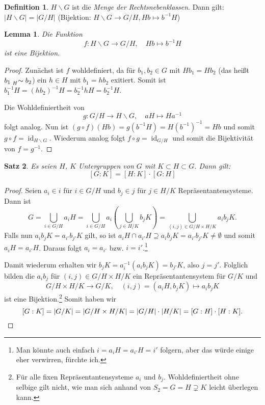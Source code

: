 \documentclass[12pt]{scrartcl} %
\DeclareMathOperator{\id}{id}
\newtheorem{thm}{Satz}[section]
\newtheorem{lemma}[thm]{Lemma}
\theoremstyle{definition}
\newtheorem*{defn}{Definition}
\theoremstyle{remark}
\begin{document}
\begin{defn}
	$H \backslash G$ ist die \emph{Menge der Rechtsnebenklassen}. Dann gilt: $\vert H \backslash G \vert = \vert G/H \vert$
	(Bijektion: $H \backslash G \rightarrow G/H, Hb \mapsto b^{-1}H$)
\end{defn}

\begin{lemma} 
	Die Funktion $$f: H\backslash G \to G/H, \quad Hb \mapsto b^{-1}H$$ ist eine Bijektion.
\end{lemma}

\begin{proof}
	Zunächst ist \(f\) wohldefiniert, da für $b_{1},b_{2} \in G$ mit $Hb_{1}=Hb_{2}$ (das heißt \(b_1 \mathrel{\prescript{}{H}{\sim}} b_2\)) ein $h \in H$ mit $b_1 = hb_2$ exitiert.
	Somit ist $b_{1}^{-1}H = (hb_2)^{-1}H = b_{2}^{-1}hH = b_{2}^{-1}H$.

	Die Wohldefiniertheit von $$g: G/H \to H\backslash G, \quad aH \mapsto Ha^{-1}$$ folgt analog.
	Nun ist $(g \circ f)(Hb) = g(b^{-1}H)=H(b^{-1})^{-1}=Hb$ und somit $g \circ f = \id_{H \backslash G}$.
	Wiederum analog folgt $f \circ g = \id_{G \slash H}$ und somit die Bijektivität von \(f = g^{-1}\).
\end{proof}

\begin{thm}
	Es seien $H$, $K$ Untergruppen von $G$ mit $K \subset H \subset G$.
	Dann gilt: $$[G:K]=[H:K]\cdot[G:H]$$
\end{thm}

\begin{proof}
	Seien \(a_i \in i\) für \(i \in G/H\) und \(b_j \in j\) für \(j \in H/K\) Repräsentantensysteme.
	Dann ist \[G = \bigcup_{i \in G/H} a_iH = \bigcup_{i \in G/H} a_i\left(\bigcup_{j\in H/K} b_jK\right) = \bigcup_{(i, j) \in G/H\times H/K} a_ib_jK.\]
	Falls nun \(a_ib_jK = a_{i'}b_{j'}K\) gilt, so ist \(a_iH \cap a_{i'}H \supseteq a_ib_jK = a_{i'}b_{j'}K \neq \emptyset\) und somit \(a_iH = a_{i'}H\).
	Daraus folgt \(a_i = a_{i'}\) bzw. \(i = i'\).\footnote{Man könnte auch einfach \(i = a_iH = a_{i'}H = i'\) folgern, aber das würde einige eher verwirren, fürchte ich.}

	Damit wiederum erhalten wir \(b_jK = a_i^{-1}(a_ib_jK) = b_{j'}K\), also \(j = j'\).
	Folglich bilden die \(a_ib_j\) für \((i, j) \in G/H\times H/K\) ein Repräsentantensystem für \(G/K\) und \[G/H\times H/K \to G/K, \quad (i, j) = (a_iH, b_jK) \mapsto a_ib_jK\] ist eine Bijektion.\footnote{Für alle fixen Repräsentantensysteme \(a_i\) und \(b_j\). Wohldefiniertheit ohne selbige gilt nicht, wie man sich anhand von \(S_2 = G = H \supsetneq K\) leicht überlegen kann.}
	Somit haben wir \[[G:K] = |G/K| = |G/H \times H/K| = |G/H|\cdot|H/K| = [G:H]\cdot[H:K].\qedhere\]
\end{proof}
\end{document}
